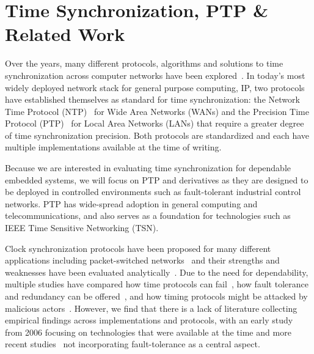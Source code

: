 
\section{Time Synchronization, PTP \& Related Work}
\label{sec:background}

Over the years, many different protocols, algorithms and solutions to time synchronization across computer networks have been explored~\cite{ntpv4-spec, sntp-spec, linuxptp, time-protocol-flooding, time-protocol-pulsesync, white-rabbit, time-protocol-wsn, time-protocol-low-power}. In today's most widely deployed network stack for general purpose computing, IP, two protocols have established themselves as standard for time synchronization: the Network Time Protocol (NTP)~\cite{ntpv4-spec} for Wide Area Networks (WANs) and the Precision Time Protocol (PTP)~\cite{ptp-spec} for Local Area Networks (LANs) that require a greater degree of time synchronization precision. Both protocols are standardized and each have multiple implementations available at the time of writing.

Because we are interested in evaluating time synchronization for dependable embedded systems, we will focus on PTP and derivatives as they are designed to be deployed in controlled environments such as fault-tolerant industrial control networks. PTP has wide-spread adoption in general computing and telecommunications, and also serves as a foundation for technologies such as IEEE Time Sensitive Networking (TSN).

Clock synchronization protocols have been proposed for many different applications including packet-switched networks~\cite{sptp, white-rabbit, time-protocol-flooding, time-protocol-low-power} and their strengths and weaknesses have been evaluated analytically~\cite{clock-synchronization-packet-switched-networks}. Due to the need for dependability, multiple studies have compared how time protocols can fail~\cite{ptp-failures}, how fault tolerance and redundancy can be offered~\cite{fault-tolerant-clock-synchronization-distributed-systems}, and how timing protocols might be attacked by malicious actors~\cite{ptp-internal-attacks, byzantine-ptp}. However, we find that there is a lack of literature collecting empirical findings across implementations and protocols, with an early study~\cite{ntp-vs-ptp} from 2006 focusing on technologies that were available at the time and more recent studies~\cite{time-enough} not incorporating fault-tolerance as a central aspect.

